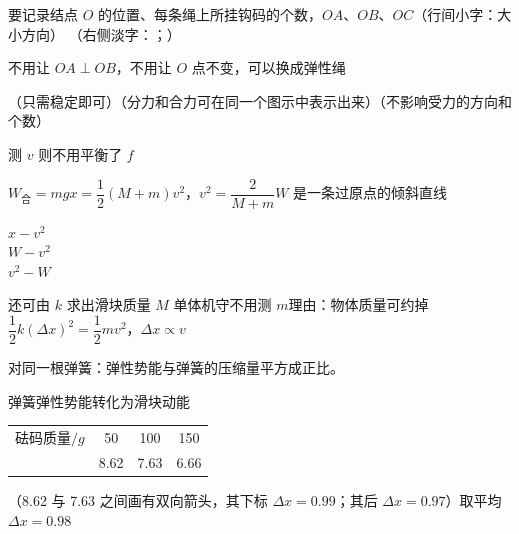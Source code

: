
要记录结点 $O$ 的位置、每条绳上所挂钩码的个数，$OA$、$OB$、$OC$（行间小字：大小方向）
（右侧淡字：；）

不用让 $OA\perp OB$，不用让 $O$ 点不变，可以换成弹性绳

（只需稳定即可）\quad（分力和合力可在同一个图示中表示出来）\quad（不影响受力的方向和个数）

测 $v$ 则不用平衡了 $f$

$W_{\text{合}}=mgx=\dfrac12(M+m)v^2$，\quad $v^2=\dfrac{2}{M+m}W$ 是一条过原点的倾斜直线

$x-v^2$ \\
$W-v^2$ \\
$v^2-W$

还可由 $k$ 求出滑块质量 $M$
单体机守不用测 $m$\quad 理由：物体质量可约掉
$\dfrac12k(\Delta x)^2=\dfrac12mv^2$，\quad $\Delta x\propto v$


\begin{keybox}
对同一根弹簧：弹性势能与弹簧的压缩量平方成正比。
\end{keybox}

弹簧弹性势能转化为滑块动能

\begin{center}
\begin{tabular}{@{}lccc@{}}
砝码质量$/\unit{g}$ & 50 & 100 & 150 \\
 & 8.62 & 7.63 & 6.66 \\
\end{tabular}
\end{center}
（8.62 与 7.63 之间画有双向箭头，其下标 $\Delta x=0.99$；其后 $\Delta x=0.97$）\quad 取平均 $\Delta x=0.98$

